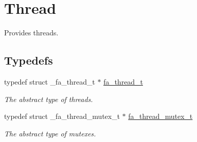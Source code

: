 \hypertarget{group___fa_thread}{\section{Thread}
\label{group___fa_thread}
}


Provides threads.  


\subsection*{Typedefs}
\begin{DoxyCompactItemize}
\item 
typedef struct \-\_\-fa\-\_\-thread\-\_\-t $\ast$ \hyperlink{group___fa_thread_gaec6debf84c8113cb354a7352b4e17abd}{fa\-\_\-thread\-\_\-t}
\begin{DoxyCompactList}\small\item\em The abstract type of threads. \end{DoxyCompactList}\item 
typedef struct \-\_\-fa\-\_\-thread\-\_\-mutex\-\_\-t $\ast$ \hyperlink{group___fa_thread_ga659c355795f6866eec71ecd8eeadbd59}{fa\-\_\-thread\-\_\-mutex\-\_\-t}
\begin{DoxyCompactList}\small\item\em The abstract type of mutexes. \end{DoxyCompactList}\end{DoxyCompactItemize}

